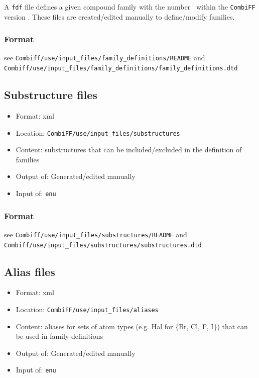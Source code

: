 \documentclass[a4paper,11pt]{article}
\begin{document}
A \texttt{fdf} file defines a given compound family with the number \fami\ within the \texttt{CombiFF} version \vers.
%
These files are created/edited manually to define/modify families.
%
\subsubsection{Format}
see \texttt{Combiff/use/input\_files/family\_definitions/README} and \texttt{Combiff/use/input\_files/family\_definitions/family\_definitions.dtd}


\subsection{Substructure files}
\label{filetype_sst}

\begin{itemize}
\item Format: xml
\item Location: \texttt{CombiFF/use/input\_files/substructures}
\item Content: substructures that can be included/excluded in the definition of families
\item Output of: Generated/edited manually
\item Input of: {\texttt{enu}}
\end{itemize}
%
\subsubsection{Format}
see \texttt{Combiff/use/input\_files/substructures/README} and \texttt{Combiff/use/input\_files/substructures/substructures.dtd}

\subsection{Alias files}\label{sec:filetype_ast}

\begin{itemize}
\item Format: xml
\item Location: \texttt{CombiFF/use/input\_files/aliases}
\item Content: aliases for sets of atom types (e.g. Hal for \{Br, Cl, F, I\}) that can be used in family definitions
\item Output of: Generated/edited manually
\item Input of: {\texttt{enu}}
\end{itemize}
\end{document}
